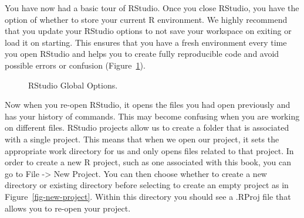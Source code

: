 \documentclass[
  letterpaper,
]{latex/krantz}
\begin{document}
You have now had a basic tour of RStudio. Once you close RStudio, you
have the option of whether to store your current R environment. We
highly recommend that you update your RStudio options
 to not save your workspace on exiting or
load it on starting. This ensures that you have a fresh environment
every time you open RStudio and helps you to create fully reproducible
code and avoid possible errors or confusion
(Figure~\ref{fig-global-options}).

\begin{figure}


\caption{\label{fig-global-options}RStudio Global Options.}

\end{figure}%

Now when you re-open RStudio, it opens the files you had open previously
and has your history of commands. This may become confusing when you are
working on different files. RStudio projects allow us to create a folder
that is associated with a single project. This means that when we open
our project, it sets the appropriate work directory for us and only
opens files related to that project. In order to create a new R
project, such as one associated with this book,
you can go to File -\textgreater{} New Project. You can then choose
whether to create a new directory or existing directory before selecting
to create an empty project as in Figure~\ref{fig-new-project}. Within
this directory you should see a .RProj file that allows you to re-open
your project.
\end{document}
